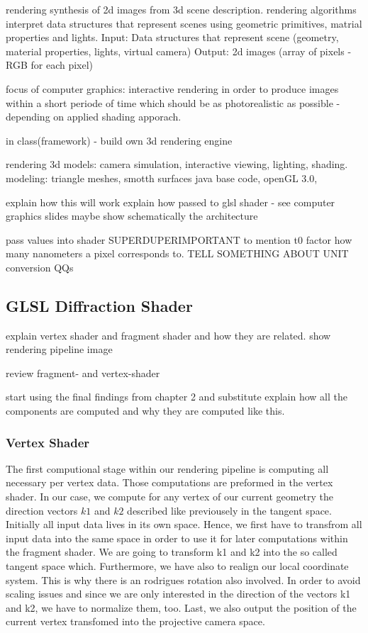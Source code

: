 rendering synthesis of 2d images from 3d scene description. rendering algorithms interpret data structures that represent scenes using geometric primitives, matrial properties and lights.
Input: Data structures that represent scene (geometry, material properties, lights, virtual camera)
Output: 2d images (array of pixels - RGB for each pixel)

focus of computer graphics: interactive rendering in order to produce images within a short periode of time which should be as photorealistic as possible - depending on applied shading apporach.


in class(framework) - build own 3d rendering engine

rendering 3d models: camera simulation, interactive viewing, lighting, shading. 
modeling: triangle meshes, smotth surfaces
java base code, openGL 3.0, 

explain how this will work
explain how passed to glsl shader - see computer graphics slides
maybe show schematically the architecture

pass values into shader
SUPERDUPERIMPORTANT to mention t0 factor how many nanometers a pixel corresponds to.
TELL SOMETHING ABOUT UNIT conversion QQs

\subsection{GLSL Diffraction Shader}
explain vertex shader and fragment shader and how they are related.
show rendering pipeline image

review fragment- and vertex-shader

start using the final findings from chapter 2 and substitute
explain how all the components are computed and why they are computed like this.

\subsubsection{Vertex Shader}
The first computional stage within our rendering pipeline is computing all necessary per vertex data. Those computations are preformed in the vertex shader. In our case, we compute for any vertex of our current geometry the direction vectors $k1$ and $k2$ described like previousely in the tangent space. Initially all input data lives in its own space. Hence, we first have to transfrom all input data into the same space in order to use it for later computations within the fragment shader. We are going to transform k1 and k2 into the so called tangent space which. Furthermore, we have also to realign our local coordinate system. This is why there is an rodrigues rotation also involved. In order to avoid scaling issues and since we are only interested in the direction of the vectors k1 and k2, we have to normalize them, too. Last, we also output the position of the current vertex transfomed into the projective camera space.
  
